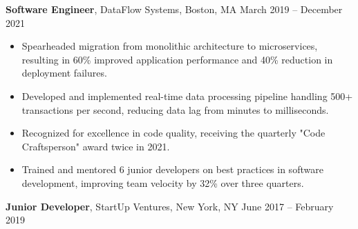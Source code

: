 \documentclass[a4paper,10pt]{article}
\begin{document}

\vspace{4pt}
{\bfseries Software Engineer}, DataFlow Systems, Boston, MA \hfill March 2019 -- December 2021

\begin{itemize}
    \item Spearheaded migration from monolithic architecture to microservices, resulting in 60\% improved application performance and 40\% reduction in deployment failures.
    
    \item Developed and implemented real-time data processing pipeline handling 500+ transactions per second, reducing data lag from minutes to milliseconds.
    
    \item Recognized for excellence in code quality, receiving the quarterly "Code Craftsperson" award twice in 2021.
    
    \item Trained and mentored 6 junior developers on best practices in software development, improving team velocity by 32\% over three quarters.
\end{itemize}

\vspace{4pt}
{\bfseries Junior Developer}, StartUp Ventures, New York, NY \hfill June 2017 -- February 2019
\end{document}
